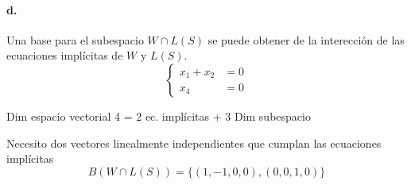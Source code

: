 \begin{problema}{\cite[6p338]{palacios}}
	\paragraph{d.} Una base para el subespacio $W\cap L(S)$ se puede obtener de la interección de las ecuaciones
	implícitas de $W$ y $L(S)$.
	$$\begin{cases}
		x_1+x_2 &= 0 \\
		x_4 &= 0
	\end{cases}$$
	\begin{center}
		Dim espacio vectorial 4 = 2 ec. implícitas + 3 Dim subespacio
	\end{center}
	Necesito dos vectores linealmente independientes que cumplan las ecuaciones implícitas
	$$B(W\cap L(S))=\{(1,-1,0,0),(0,0,1,0)\}$$
\end{problema}

